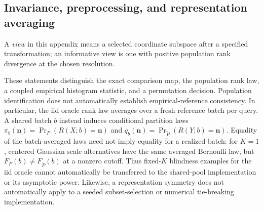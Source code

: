{\color{purple}
\subsection{Invariance, preprocessing, and representation averaging}
\label{app:invariance-preprocessing}

A \emph{view} in this appendix means a selected coordinate subspace after a specified transformation; an informative view is one with positive population rank divergence at the chosen resolution.

These statements distinguish the exact comparison map, the population rank law, a coupled empirical histogram statistic, and a permutation decision. Population identification does not automatically establish empirical-reference consistency. In particular, the iid oracle rank law averages over a fresh reference batch per query. A shared batch $b$ instead induces conditional partition laws $\pi_b(\mathbf n)=\Pr_P(R(X;b)=\mathbf n)$ and $q_b(\mathbf n)=\Pr_{\widetilde P}(R(Y;b)=\mathbf n)$. Equality of the batch-averaged laws need not imply equality for a realized batch: for $K=1$, centered Gaussian scale alternatives have the same averaged Bernoulli law, but $F_P(b)\ne F_{\widetilde P}(b)$ at a nonzero cutoff. Thus fixed-$K$ blindness examples for the iid oracle cannot automatically be transferred to the shared-pool implementation or its asymptotic power. Likewise, a representation symmetry does not automatically apply to a seeded subset-selection or numerical tie-breaking implementation.

}
